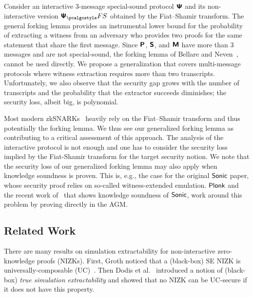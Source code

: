   Consider an interactive $3$-message
special-sound protocol $\bm{\mathsf{\Psi}}$ and its non-interactive version $\ps_\fs$ obtained by the
Fiat--Shamir transform. The general forking lemma provides an instrumental lower bound for the
probability of extracting a witness from an adversary who provides two proofs for the same
statement that share the first message. Since $\bm{\mathsf{P}}$, $\bm{\mathsf{S}}$, and $\bm{\mathsf{M}}$ have more than $3$
messages and are not special-sound, the forking lemma of Bellare and Neven~\cite{CCS:BelNev06},
cannot be used directly. We propose a generalization that covers multi-message protocols where
witness extraction requires more than two transcripts.  Unfortunately, we also observe
that the security gap grows with the number of transcripts and the probability that the
extractor succeeds diminishes; the security loss, albeit big, is polynomial.

Most modern zkSNARKs~\cite{SP:BBBPWM18,CCS:MBKM19} heavily
rely on the Fiat--Shamir transform and thus potentially the forking lemma.
We thus see our generalized forking lemma as contributing to a critical assessment of
this approach. The analysis of the interactive protocol is not enough and one
has to consider the security loss implied by the Fiat-Shamir transform for the target security notion.
We note that the security loss of our generalized forking lemma may also apply
when knowledge soundness is proven. This is, e.g., the case for the original
${\textnormal{\textsf{Sonic}}}$ paper, whose security proof relies on so-called witness-extended
emulation. $\textnormal{\textsf{Plonk}}$ and the recent work of~\cite{cryptoeprint:2020:1351} that shows knowledge soundness of
${\textnormal{\textsf{Sonic}}}$, work around this problem by proving directly in the AGM.



\subsection{Related Work}
 

There are many results on simulation extractability for
non-interactive zero-knowledge proofs (NIZKs). First, Groth \cite{AC:Groth07}
noticed that a (black-box) SE NIZK is
universally-composable (UC)~\cite{EPRINT:Canetti00}. Then Dodis et al.~\cite{AC:DHLW10} introduced a
notion of (black-box) \emph{true simulation extractability} and showed that no
NIZK can be UC-secure if it does not have this property. 

